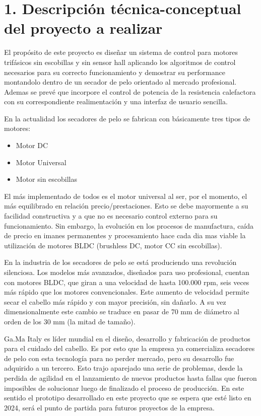 \documentclass[
11pt, %
codirector, %
]{charter}
\begin{document}
\section{1. Descripción técnica-conceptual del proyecto a realizar}
\label{sec:descripcion}

El propósito de este proyecto es diseñar un sistema de control para motores trifásicos sin escobillas y sin sensor hall aplicando los algoritmos de control necesarios para su correcto funcionamiento y demostrar su performance montandolo dentro de un secador de pelo orientado al mercado profesional. Ademas se prevé que incorpore el control de potencia de la resistencia calefactora con su correspondiente realimentación y una interfaz de usuario sencilla.

En la actualidad los secadores de pelo se fabrican con básicamente tres tipos de motores:
\begin{itemize}
	\item Motor DC
	\item Motor Universal
	\item Motor sin escobillas
\end{itemize}
El más implementado de todos es el motor universal al ser, por el momento, el más equilibrado en relación precio/prestaciones. Esto se debe mayormente a su facilidad constructiva y a que no es necesario control externo para su funcionamiento.
Sin embargo, la evolución en los procesos de manufactura, caída de precio en imanes permanentes y procesamiento hace cada dia mas viable la utilización de motores BLDC (brushless DC, motor CC sin escobillas).

En la industria de los secadores de pelo se está produciendo una revolución silenciosa. Los modelos más avanzados, diseñados para uso profesional, cuentan con motores BLDC, que giran a una velocidad de hasta 100.000 rpm, seis veces más rápido que los motores convencionales. Este aumento de velocidad permite secar el cabello más rápido y con mayor precisión, sin dañarlo. A su vez dimensionalmente este cambio se traduce en pasar de 70 mm de diámetro al orden de los 30 mm (la mitad de tamaño).

Ga.Ma Italy es líder mundial en el diseño, desarrollo y fabricación de productos para el cuidado del cabello. Es por esto que la empresa ya comercializa secadores de pelo con esta tecnología para no perder mercado, pero su desarrollo fue adquirido a un tercero. Esto trajo aparejado una serie de problemas, desde la perdida de agilidad en el lanzamiento de nuevos productos hasta fallas que fueron imposibles de solucionar luego de finalizado el proceso de producción. En este sentido el prototipo desarrollado en este proyecto que se espera que esté listo en 2024, será el punto de partida para futuros proyectos de la empresa.
\end{document}
